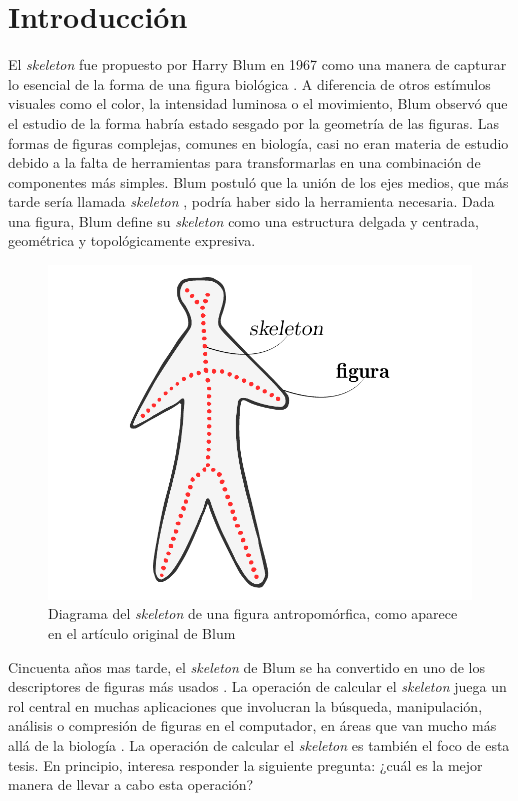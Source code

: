 \chapter{Introducción}
\label{ch:introduction}

El \textit{skeleton} fue propuesto por Harry Blum en 1967 como una manera de capturar lo esencial de la forma de una figura biológica \cite{Blum:1967}. A diferencia de otros estímulos visuales como el color, la intensidad luminosa o el movimiento, Blum observó que el estudio de la forma habría estado sesgado por la geometría de las figuras. Las formas de figuras complejas, comunes en biología, casi no eran materia de estudio debido a la falta de herramientas para transformarlas en una combinación de componentes más simples. Blum postuló que la unión de los ejes medios, que más tarde sería llamada \textit{skeleton} \cite{hilitch1969linear}, podría haber sido la herramienta necesaria. Dada una figura, Blum define su \textit{skeleton} como una estructura delgada y centrada, geométrica y topológicamente expresiva.

\begin{figure}[ht]\centering
\includegraphics[width=0.5\linewidth]{images/blum}
\caption{Diagrama del \textit{skeleton} de una figura antropomórfica, como aparece en el artículo original de Blum \cite{Blum:1967}}
\label{fig:blum}
\end{figure}

Cincuenta años mas tarde, el \textit{skeleton} de Blum se ha convertido en uno de los descriptores de figuras más usados \cite{sobiecki2013qualitative}. La operación de calcular el \textit{skeleton} juega un rol central en muchas aplicaciones que involucran la búsqueda, manipulación, análisis o compresión de figuras en el computador, en áreas que van mucho más allá de la biología \cite{Saha2015}. La operación de calcular el \textit{skeleton} es también el foco de esta tesis. En principio, interesa responder la siguiente pregunta: ¿cuál es la mejor manera de llevar a cabo esta operación?


